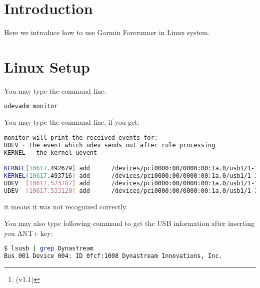 \documentclass[letter,12pt,onecolumn]{article}
\title{\doctitle}
\date{} %
\author{
  \docauthor%
    \thanks{
        (v1.1)}
}
\newcommand{\cnt}[3]{{#1}{#2}{#3}}
\renewcommand{\cnt}[3]{#2}
\renewcommand{\cnt}[3]{#3}
\renewcommand{\cnt}[3]{#1}
\begin{document}
\maketitle

\section{\cnt{Introduction}{介绍}{介紹}}
\cnt{Here we introduce how to use Garmin Forerunner in Linux system.} %
    {这里要介绍 Garmin Forerunner 在Linux下的使用。}
    {這裏要介紹 Garmin Forerunner 在Linux下的使用。}

\section{\cnt{Linux Setup}{Linux 系统设置}{Linux 系統設置}}

\cnt{You may type the command line:}
    {先输入命令：}
    {先輸入命令：}
\begin{lstlisting}[language=bash]
udevadm monitor
\end{lstlisting}

\cnt{You may type the command line, if you get:}
    {然后插入 ANT+ key，如果得到如下信息：}
    {然後插入 ANT+ key，如果得到如下信息：}
\begin{lstlisting}[language=bash]
monitor will print the received events for:
UDEV - the event which udev sends out after rule processing
KERNEL - the kernel uevent

KERNEL[10617.492679] add      /devices/pci0000:00/0000:00:1a.0/usb1/1-1/1-1.2 (usb)
KERNEL[10617.493716] add      /devices/pci0000:00/0000:00:1a.0/usb1/1-1/1-1.2/1-1.2:1.0 (usb)
UDEV  [10617.523787] add      /devices/pci0000:00/0000:00:1a.0/usb1/1-1/1-1.2 (usb)
UDEV  [10617.533120] add      /devices/pci0000:00/0000:00:1a.0/usb1/1-1/1-1.2/1-1.2:1.0 (usb)
\end{lstlisting}
\cnt{it means it was not recognized correctly.}
    {表示没有识别正确。}
    {表示沒有識別正確。}

\cnt{You may also type following command to get the USB information after inserting you ANT+ key:}
    {也可以插入 ANT+ key，然后使用如下命令获取信息：}
    {也可以插入 ANT+ key，然後使用如下命令獲取信息：}
\begin{lstlisting}[language=bash]
$ lsusb | grep Dynastream
Bus 001 Device 004: ID 0fcf:1008 Dynastream Innovations, Inc.
\end{lstlisting}
\end{document}
